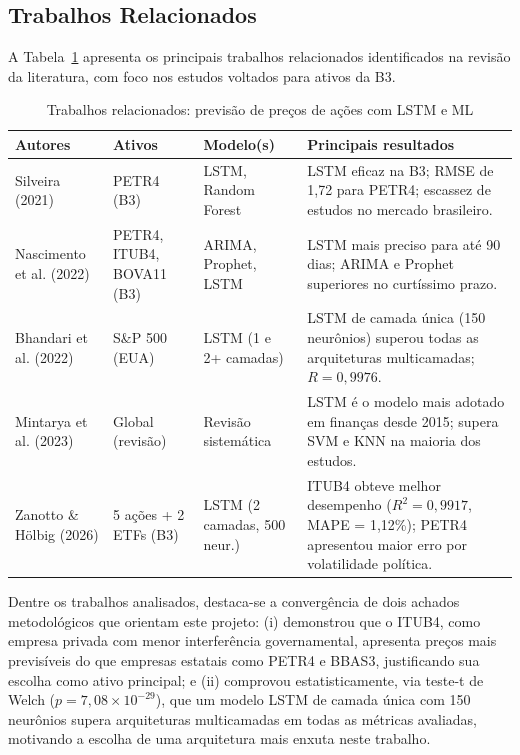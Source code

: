 \documentclass[12pt]{article}
\begin{document}
\subsection{Trabalhos Relacionados}

A Tabela~\ref{tab:relacionados} apresenta os principais trabalhos relacionados
identificados na revisão da literatura, com foco nos estudos voltados para
ativos da B3.

\begin{table}[ht]
\centering
\caption{Trabalhos relacionados: previsão de preços de ações com LSTM e ML}
\label{tab:relacionados}
\begin{tabular}{p{3.2cm} p{2.5cm} p{2.2cm} p{5.1cm}}
\toprule
\textbf{Autores} & \textbf{Ativos} & \textbf{Modelo(s)} & \textbf{Principais resultados} \\
\midrule
Silveira (2021)
  & PETR4 (B3)
  & LSTM, Random Forest
  & LSTM eficaz na B3; RMSE de 1,72 para PETR4; escassez de estudos no mercado brasileiro. \\
\midrule
Nascimento et al. (2022)
  & PETR4, ITUB4, BOVA11 (B3)
  & ARIMA, Prophet, LSTM
  & LSTM mais preciso para até 90 dias; ARIMA e Prophet superiores no curtíssimo prazo. \\
\midrule
Bhandari et al. (2022)
  & S\&P 500 (EUA)
  & LSTM (1 e 2+ camadas)
  & LSTM de camada única (150 neurônios) superou todas as arquiteturas multicamadas; $R = 0{,}9976$. \\
\midrule
Mintarya et al. (2023)
  & Global (revisão)
  & Revisão sistemática
  & LSTM é o modelo mais adotado em finanças desde 2015; supera SVM e KNN na maioria dos estudos. \\
\midrule
Zanotto \& Hölbig (2026)
  & 5 ações + 2 ETFs (B3)
  & LSTM (2 camadas, 500 neur.)
  & ITUB4 obteve melhor desempenho ($R^2 = 0{,}9917$, MAPE = 1,12\%); PETR4 apresentou maior erro por volatilidade política. \\
\bottomrule
\end{tabular}
\end{table}

Dentre os trabalhos analisados, destaca-se a convergência de dois
achados metodológicos que orientam este projeto: (i) \cite{zanotto:2026}
demonstrou que o ITUB4, como empresa privada com menor interferência
governamental, apresenta preços mais previsíveis do que empresas estatais
como PETR4 e BBAS3, justificando sua escolha como ativo principal; e (ii)
\cite{bhandari:2022} comprovou estatisticamente, via teste-t de Welch
($p = 7{,}08 \times 10^{-29}$), que um modelo LSTM de camada única com
150 neurônios supera arquiteturas multicamadas em todas as métricas avaliadas,
motivando a escolha de uma arquitetura mais enxuta neste trabalho.
\end{document}
